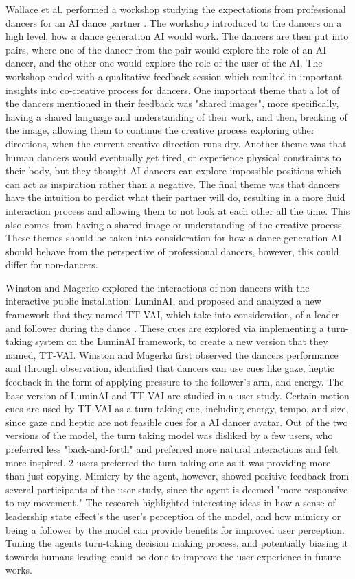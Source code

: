 \documentclass[final,5p,times,twocolumn,authoryear]{article}
\begin{document}
Wallace et al. performed a workshop studying the expectations from
professional dancers for an AI dance partner \cite{Wallace2023}. The workshop introduced to
the dancers on a high level, how a dance generation AI would work. The
dancers are then put into pairs, where one of the dancer from the pair
would explore the role of an AI dancer, and the other one would explore
the role of the user of the AI. The workshop ended with a qualitative
feedback session which resulted in important insights into co-creative
process for dancers. One important theme that a lot of the dancers
mentioned in their feedback was "shared images", more specifically,
having a shared language and understanding of their work, and then,
breaking of the image, allowing them to continue the creative process
exploring other directions, when the current creative direction runs
dry. Another theme was that human dancers would eventually get tired, or
experience physical constraints to their body, but they thought AI
dancers can explore impossible positions which can act as inspiration
rather than a negative. The final theme was that dancers have the
intuition to perdict what their partner will do, resulting in a more
fluid interaction process and allowing them to not look at each other
all the time. This also comes from having a shared image or
understanding of the creative process. These themes should be taken into
consideration for how a dance generation AI should behave from the
perspective of professional dancers, however, this could differ for
non-dancers.

Winston and Magerko explored the interactions of non-dancers with the
interactive public installation: LuminAI, and proposed and analyzed a
new framework that they named TT-VAI, which take into consideration, of
a leader and follower during the dance \cite{Winston2017}. 
These cues are explored via implementing a
turn-taking system on the LuminAI framework, to create a new version
that they named, TT-VAI. Winston and Magerko first observed the dancers
performance and through observation, identified that dancers can use
cues like gaze, heptic feedback in the form of applying pressure to the
follower's arm, and energy. The base version of LuminAI and TT-VAI are
studied in a user study. Certain motion cues are used by TT-VAI as a
turn-taking cue, including energy, tempo, and size, since gaze and
heptic are not feasible cues for a AI dancer avatar. Out of the two versions of the
model, the turn taking model was disliked by a few users, who preferred
less "back-and-forth" and preferred more natural interactions and felt
more inspired. 2 users preferred the turn-taking one as it was providing
more than just copying. Mimicry by the agent, however, showed positive
feedback from several participants of the user study, since the agent is
deemed "more responsive to my movement." The research highlighted
interesting ideas in how a sense of leadership state effect's the user's
perception of the model, and how mimicry or being a follower by the
model can provide benefits for improved user perception. Tuning the
agents turn-taking decision making process, and potentially biasing it
towards humans leading could be done to improve the user experience in
future works.
\end{document}
